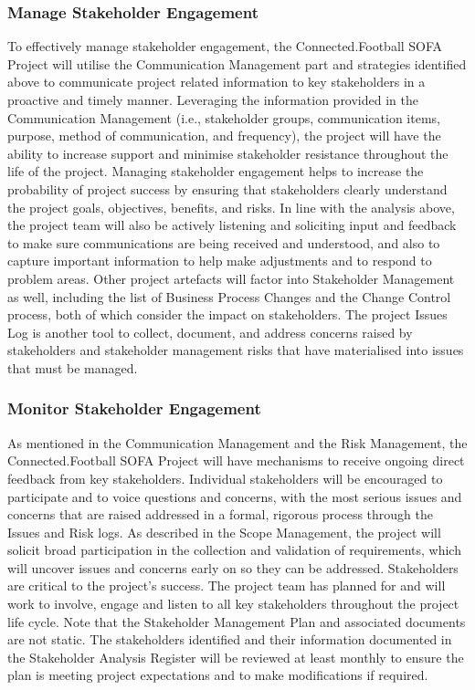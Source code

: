\subsubsection{Manage Stakeholder Engagement}
\label{sssec:manage_stakeholder_engagement}

To effectively manage stakeholder engagement, the Connected.Football SOFA Project will utilise the Communication Management part and strategies identified above to communicate project related information to key stakeholders in a proactive and timely manner.  Leveraging the information provided in the Communication Management (i.e., stakeholder groups, communication items, purpose, method of communication, and frequency), the project will have the ability to increase support and minimise stakeholder resistance throughout the life of the project.  Managing stakeholder engagement helps to increase the probability of project success by ensuring that stakeholders clearly understand the project goals, objectives, benefits, and risks. 
\newline
In line with the analysis above, the project team will also be actively listening and soliciting input and feedback to make sure communications are being received and understood, and also to capture important information to help make adjustments and to respond to problem areas.
\newline
Other project artefacts will factor into Stakeholder Management as well, including the list of Business Process Changes and the Change Control process, both of which consider the impact on stakeholders.  The project Issues Log is another tool to collect, document, and address concerns raised by stakeholders and stakeholder management risks that have materialised into issues that must be managed.

\subsubsection{Monitor Stakeholder Engagement}
\label{sssec:monitor_stakeholder_engagement}

As mentioned in the Communication Management and the Risk Management, the Connected.Football SOFA Project will have mechanisms to receive ongoing direct feedback from key stakeholders. Individual stakeholders will be encouraged to participate and to voice questions and concerns, with the most serious issues and concerns that are raised addressed in a formal, rigorous process through the Issues and Risk logs.
\newline
As described in the Scope Management, the project will solicit broad participation in the collection and validation of requirements, which will uncover issues and concerns early on so they can be addressed.
Stakeholders are critical to the project’s success.  The project team has planned for and will work to involve, engage and listen to all key stakeholders throughout the project life cycle.
\newline
Note that the Stakeholder Management Plan and associated documents are not static.  The stakeholders identified and their information documented in the Stakeholder Analysis Register will be reviewed at least monthly to ensure the plan is meeting project expectations and to make modifications if required.


